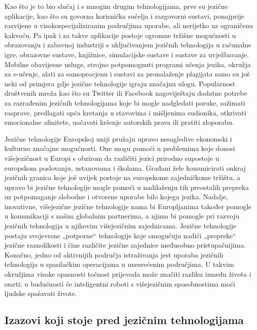\begin{multicols}{2}
Kao što je to bio slučaj i s mnogim drugim tehnologijama, prve su jezične aplikacije, kao što su govorna korisnička sučelja i razgovorni sustavi, ponajprije razvijene u visokospecijaliziranim područjima uporabe, ali nerijetko uz ograničenu kakvoću. Pa ipak i za takve aplikacije postoje ogromne tržišne mogućnosti u obrazovanju i zabavnoj industriji s uključivanjem jezičnih tehnologija u računalne igre, obrazovne sustave, knjižnice, simulacijske sustave i sustave za uvježbavanje. Mobilne obavijesne usluge, strojno potpomognuti programi učenja jezika, okružja za e-učenje, alati za samoprocjenu i sustavi za pronalaženje plagijata samo su još neki od primjera gdje jezične tehnologije igraju značajnu ulogu. Popularnost društvenih mreža kao što su Twitter ili Facebook nagoviještaju dodatne potrebe za razrađenim jezičnih tehnologijama koje bi mogle nadgledati poruke, sažimati rasprave, predlagati opća kretanja u stavovima i mišljenima sudionika, otkrivati emocionalne afinitete, uočavati kršenje autorskih prava ili pratiti zloporabu.


Jezične tehnologije Europskoj uniji pružaju upravo nesagledive ekonomski i kulturno značajne mogućnosti. One mogu pomoći u problemima koje donosi višejezičnost u Europi s obzirom da različiti jezici prirodno supostoje u europskom poslovanju, ustanovama  i školama. Građani žele komunicirati onkraj jezičnih granica koje još uvijek postoje na europskome zajedničkome tržištu, a upravo bi jezične tehnologije mogle pomoći u nadilaženju tih preostalih prepreka uz potpomaganje slobodne i otvorene uporabe bilo kojega jezika. Nadalje, inovativne, višejezične jezične tehnologije nama bi Europljanima također pomogle u komunikaciji s našim globalnim partnerima, a njima bi pomogle pri razvoju jezičnih tehnologija u njihovim višejezičnim zajednicama. Jezične tehnologije postaju svojevrsne „potporne“ tehnologije koje omogućuju nadići „prepreke“ jezične raznolikosti i čine različite jezične zajednice međusobno pristupačnijima. Konačno, jedno od aktivnijih područja istraživanja jest uporaba jezičnih tehnologija u spasilačkim operacijama u unesrećenim područjima. U takvim okružjima visoke opasnosti točnost prijevoda može značiti razliku između života i smrti: u budućnosti će inteligentni roboti s višejezičnim sposobnostima moći ljudske spašavati živote.

\subsection{Izazovi koji stoje pred jezičnim tehnologijama}


\end{multicols}
